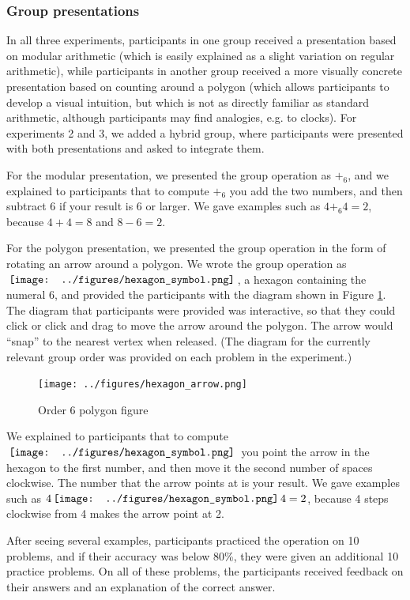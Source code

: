 \documentclass[man,10pt]{apa6}
\newcommand{\hex}{\,\vcenter{\hbox{\texttt{[image: ../figures/hexagon\_symbol.png]}}}\,}
\begin{document}
\subsubsection{Group presentations}
In all three experiments, participants in one group received a presentation based on modular arithmetic (which is easily explained as a slight variation on regular arithmetic), while participants in another group received a more visually concrete presentation based on counting around a polygon (which allows participants to develop a visual intuition, but which is not as directly familiar as standard arithmetic, although participants may find analogies, e.g. to clocks). For experiments 2 and 3, we added a hybrid group, where participants were presented with both presentations and asked to integrate them. \par 
For the modular presentation, we presented the group operation as $+_6$, and we explained to participants that to compute $+_6$ you add the two numbers, and then subtract $6$ if your result is $6$ or larger. We gave examples such as $4 +_6 4 = 2$, because $4+4 = 8$ and $8-6=2$.\par
For the polygon presentation, we presented the group operation in the form of rotating an arrow around a polygon. We wrote the group operation as $\hex$, a hexagon containing the numeral $6$, and provided the participants with the diagram shown in Figure \ref{hexagonex}. The diagram that participants were provided was interactive, so that they could click or click and drag to move the arrow around the polygon. The arrow would ``snap'' to the nearest vertex when released. (The diagram for the currently relevant group order was provided on each problem in the experiment.)
\begin{figure} \centering \texttt{[image: ../figures/hexagon\_arrow.png]} \caption{Order 6 polygon figure} \label{hexagonex} \end{figure} \noindent
We explained to participants that to compute $\hex$ you point the arrow in the hexagon to the first number, and then move it the second number of spaces clockwise. The number that the arrow points at is your result. We gave examples such as $4 \hex 4 = 2$, because 4 steps clockwise from 4 makes the arrow point at 2. \par
After seeing several examples, participants practiced the operation on 10 problems, and if their accuracy was below 80\%, they were given an additional 10 practice problems. On all of these problems, the participants received feedback on their answers and an explanation of the correct answer. \par 
\end{document}

